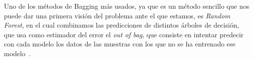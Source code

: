 Uno de los métodos de Bagging más usados, ya que es un método sencillo que nos puede dar una primera visión del problema ante el que estamos, es \textit{Random Forest}, en el cual combinamos las predicciones de distintos árboles de decisión, que usa como estimador del error el \textit{out of bag}, que consiste en intentar predecir con cada modelo los datos de las muestras con los que no se ha entrenado ese modelo~\cite{mdrf}.